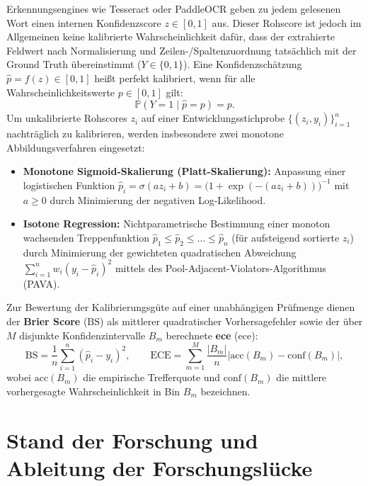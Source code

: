 Erkennungsengines wie Tesseract oder PaddleOCR geben zu jedem gelesenen Wort einen internen Konfidenzscore $z \in [0, 1]$ aus. Dieser Rohscore ist jedoch im Allgemeinen keine kalibrierte Wahrscheinlichkeit dafür, dass der extrahierte Feldwert nach Normalisierung und Zeilen-/Spaltenzuordnung tatsächlich mit der Ground Truth übereinstimmt ($Y \in \{0, 1\}$). Eine Konfidenzschätzung $\hat{p} = f(z) \in [0, 1]$ heißt perfekt kalibriert, wenn für alle Wahrscheinlichkeitswerte $p \in [0, 1]$ gilt:
\begin{equation}
  \mathbb{P}(Y = 1 \mid \hat{p} = p) = p.
  \label{eq:perfect-calibration}
\end{equation}
Um unkalibrierte Rohscores $z_i$ auf einer Entwicklungsstichprobe $\{(z_i, y_i)\}_{i=1}^{n}$ nachträglich zu kalibrieren, werden insbesondere zwei monotone Abbildungsverfahren eingesetzt:
\begin{itemize}
  \item \textbf{Monotone Sigmoid-Skalierung (Platt-Skalierung):} Anpassung einer logistischen Funktion $\hat{p}_i = \sigma(a z_i + b) = \bigl(1 + \exp(-(a z_i + b))\bigr)^{-1}$ mit $a \ge 0$ durch Minimierung der negativen Log-Likelihood.
  \item \textbf{Isotone Regression:} Nichtparametrische Bestimmung einer monoton wachsenden Treppenfunktion $\hat{p}_1 \le \hat{p}_2 \le \ldots \le \hat{p}_n$ (für aufsteigend sortierte $z_i$) durch Minimierung der gewichteten quadratischen Abweichung $\sum_{i=1}^{n} w_i (y_i - \hat{p}_i)^2$ mittels des Pool-Adjacent-Violators-Algorithmus (PAVA).
\end{itemize}
Zur Bewertung der Kalibrierungsgüte auf einer unabhängigen Prüfmenge dienen der \textbf{Brier Score} ($\mathrm{BS}$) als mittlerer quadratischer Vorhersagefehler sowie der über $M$ disjunkte Konfidenzintervalle $B_m$ berechnete \textbf{\acl{ece}} (\ac{ece}):
\begin{equation}
  \mathrm{BS} = \frac{1}{n} \sum_{i=1}^{n} (\hat{p}_i - y_i)^2, \qquad
  \mathrm{ECE} = \sum_{m=1}^{M} \frac{|B_m|}{n} \bigl| \mathrm{acc}(B_m) - \mathrm{conf}(B_m) \bigr|,
  \label{eq:brier-ece}
\end{equation}
wobei $\mathrm{acc}(B_m)$ die empirische Trefferquote und $\mathrm{conf}(B_m)$ die mittlere vorhergesagte Wahrscheinlichkeit in Bin $B_m$ bezeichnen.

\section{Stand der Forschung und Ableitung der Forschungslücke}
\label{sec:forschungsstand}

